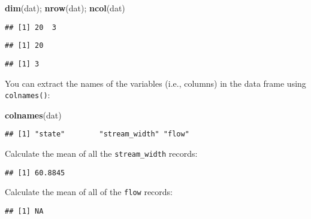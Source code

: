 \documentclass[]{book}
\newenvironment{Shaded}{\begin{snugshade}}{\end{snugshade}}
\newcommand{\KeywordTok}[1]{\textcolor[rgb]{0.13,0.29,0.53}{\textbf{#1}}}
\newcommand{\OperatorTok}[1]{\textcolor[rgb]{0.81,0.36,0.00}{\textbf{#1}}}
\newcommand{\NormalTok}[1]{#1}
\theoremstyle{definition}
\theoremstyle{definition}
\theoremstyle{definition}
\theoremstyle{remark}
\begin{document}
\begin{Shaded}
\begin{Highlighting}[]
\KeywordTok{dim}\NormalTok{(dat); }\KeywordTok{nrow}\NormalTok{(dat); }\KeywordTok{ncol}\NormalTok{(dat)}
\end{Highlighting}
\end{Shaded}

\begin{verbatim}
## [1] 20  3
\end{verbatim}

\begin{verbatim}
## [1] 20
\end{verbatim}

\begin{verbatim}
## [1] 3
\end{verbatim}

You can extract the names of the variables (i.e., columns) in the data
frame using \texttt{colnames()}:

\begin{Shaded}
\begin{Highlighting}[]
\KeywordTok{colnames}\NormalTok{(dat)}
\end{Highlighting}
\end{Shaded}

\begin{verbatim}
## [1] "state"        "stream_width" "flow"
\end{verbatim}

Calculate the mean of all the \texttt{stream\_width} records:

\begin{Shaded}
\end{Shaded}

\begin{verbatim}
## [1] 60.8845
\end{verbatim}

Calculate the mean of all of the \texttt{flow} records:

\begin{Shaded}
\end{Shaded}

\begin{verbatim}
## [1] NA
\end{verbatim}
\end{document}
